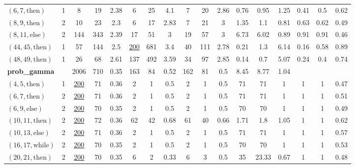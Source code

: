 \documentclass[sigconf]{acmart}
\newcommand{\thenBr}{\text{then}}
\newcommand{\elseBr}{\text{else}}
\newcommand{\inWhile}{\text{while}}
\newcommand{\un}[1]{\underline{#1}}
\begin{document}
\begin{table}[!t]
\begin{tabular}{lc|ccc|ccc|ccc|ccc|ccc}
    $(6,7,\thenBr)$   & 1        & 8        & 19   & 2.38      & 6    & 25   & 4.1          & 7   & 20  & 2.86             & 0.76   & 0.95  & 1.25   & 0.41 & 0.5  &  0.62 \\
    $(8,9,\thenBr)$   & 2        & 10       & 23   & 2.3       & 6    & 17   & 2.83         & 7   & 21  & 3                & 1.35   & 1.1   & 0.81   & 0.63 & 0.62 &  0.49 \\
    $(8,11,\elseBr)$  & 2        & 144      & 343  & 2.39      & 17   & 51   & 3            & 19  & 57  & 3                & 6.73   & 6.02  & 0.89   & 0.91 & 0.91 &  0.46 \\
    $(44,45,\thenBr)$ & 1        & 57       & 144  & 2.5       & \un{200} & 681  & 3.4      & 40  & 111 & 2.78             & 0.21   & 1.3   & 6.14   & 0.16 & 0.58 &  0.89 \\
    $(48,49,\thenBr)$ & 1        & 26       & 68   & 2.61      & 137  & 492  & 3.59         & 34  & 97  & 2.85             & 0.14   & 0.7   & 5.07   & 0.24 & 0.4  &  0.74 \\
    \toprule
\multicolumn{2}{l|}{\textbf{prob\_gamma}}        
                                 & 2006     & 710  & 0.35      & 163 & 84   & 0.52          & 162 & 81  & 0.5              & 8.45   & 8.77  & 1.04   &  &   &        \\
    $(4,5,\thenBr)$   & 1        & \un{200} & 71   & 0.36      & 2   & 1    & 0.5           & 2   & 1   & 0.5              & 71     & 71    & 1      & 1 & 1 &  0.47  \\
    $(6,7,\thenBr)$   & 2        & \un{200} & 71   & 0.36      & 2   & 1    & 0.5           & 2   & 1   & 0.5              & 71     & 71    & 1      & 1 & 1 &  0.51  \\
    $(6,9,\elseBr)$   & 2        & \un{200} & 70   & 0.35      & 2   & 1    & 0.5           & 2   & 1   & 0.5              & 70     & 70    & 1      & 1 & 1 &  0.49  \\
    $(10,11,\thenBr)$ & 2        & \un{200} & 72   & 0.36      & 62  & 42   & 0.68          & 61  & 40  & 0.66             & 1.71   & 1.8   & 1.05   & 1 & 1 &  0.62  \\
    $(10,13,\elseBr)$ & 2        & \un{200} & 71   & 0.36      & 2   & 1    & 0.5           & 2   & 1   & 0.5              & 71     & 71    & 1      & 1 & 1 &  0.57  \\
    $(16,17,\inWhile)$& 2        & \un{200} & 70   & 0.35      & 2   & 1    & 0.5           & 2   & 1   & 0.5              & 70     & 70    & 1      & 1 & 1 &  0.53  \\
    $(20,21,\thenBr)$ & 2        & \un{200} & 70   & 0.35      & 6   & 2    & 0.33          & 6   & 3   & 0.5              & 35     & 23.33 & 0.67   & 1 & 1 & 0.48   \\

\end{tabular}
\end{table}
\end{document}
